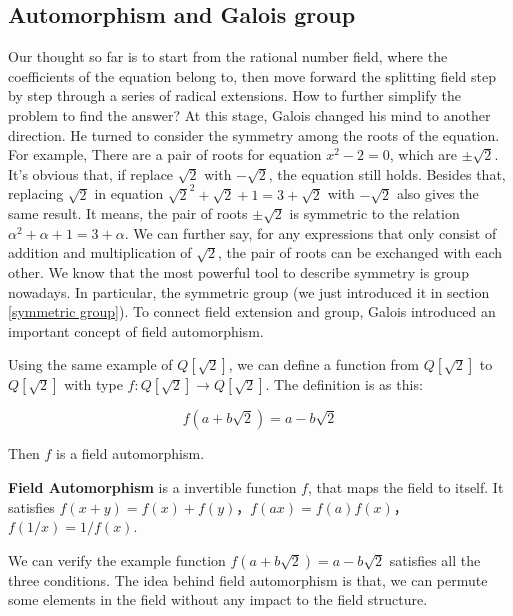 \documentclass{article}
\begin{document}
\begin{Exercise}
\end{Exercise}

\subsection{Automorphism and Galois group}

Our thought so far is to start from the rational number field, where the coefficients of the equation belong to, then move forward the splitting field step by step through a series of radical extensions. How to further simplify the problem to find the answer? At this stage, Galois changed his mind to another direction. He turned to consider the symmetry among the roots of the equation. For example, There are a pair of roots for equation $x^2 - 2 = 0$, which are $\pm \sqrt{2}$. It's obvious that, if replace $\sqrt{2}$ with $-\sqrt{2}$, the equation still holds. Besides that, replacing $\sqrt{2}$ in equation $\sqrt{2}^2 + \sqrt{2} + 1 = 3 + \sqrt{2}$ with $-\sqrt{2}$ also gives the same result. It means, the pair of roots $\pm \sqrt{2}$ is symmetric to the relation $\alpha^2 + \alpha + 1 = 3 + \alpha$. We can further say, for any expressions that only consist of addition and multiplication of $\sqrt{2}$, the pair of roots can be exchanged with each other. We know that the most powerful tool to describe symmetry is group nowadays. In particular, the symmetric group (we just introduced it in section \ref{symmetric group}). To connect field extension and group, Galois introduced an important concept of field automorphism.

Using the same example of $Q[\sqrt{2}]$, we can define a function from $Q[\sqrt{2}]$ to $Q[\sqrt{2}]$ with type $f: Q[\sqrt{2}] \to Q[\sqrt{2}]$. The definition is as this:

\[
f(a + b \sqrt{2}) = a - b \sqrt{2}
\]

Then $f$ is a field automorphism.

\begin{definition}
\textbf{Field Automorphism} is a invertible function $f$, that maps the field to itself. It satisfies $f(x + y) = f(x) + f(y)$，$f(ax) = f(a) f(x)$，$f(1/x) = 1/f(x)$.
\end{definition}

We can verify the example function $f(a + b \sqrt{2}) = a - b \sqrt{2}$ satisfies all the three conditions. The idea behind field automorphism is that, we can permute some elements in the field without any impact to the field structure.
\end{document}

